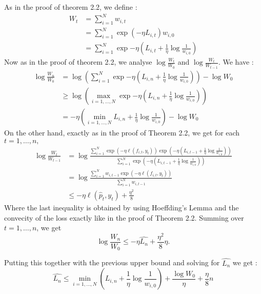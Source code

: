 \begin{solution}[]
	As in the proof of theorem 2.2, we define :
\begin{align*}
	W_t &= \sum_{i=1}^{N}w_{i,t} \\
	    &= \sum_{i=1}^{N}\exp{(-\eta L_{i,t})}w_{i,0} \\
	    &= \sum_{i=1}^{N}\exp{-\eta \left(L_{i,t} + \frac{1}{\eta}\log \frac{1}{w_{i,0}}\right)}
\end{align*}
Now as in the proof of theorem 2.2, we analyse $ \log \frac{W_t}{W_0} $ and $ \log \frac{W_t}{W_{t-1}} $.
We have :
\begin{align*}
	\log \frac{W_n}{W_0} &= \log \left( \sum_{i=1}^{N}\exp{-\eta \left(L_{i,n} + \frac{1}{\eta}\log \frac{1}{w_{i,0}}\right)} \right) - \log W_0 \\
			     &\geq \log \left( \max_{i=1,\ldots,N}\exp{-\eta \left(L_{i,n} + \frac{1}{\eta}\log \frac{1}{w_{i,0}}\right)} \right) \\
			     &= - \eta \left( \min_{i=1,\ldots,N}L_{i,n} + \frac{1}{\eta}\log \frac{1}{w_{i,0}} \right) - \log W_0
\end{align*}
On the other hand, exactly as in the proof of Theorem 2.2, we get for each $ t=1,\ldots,n, $
\begin{align*}
	\log \frac{W_t}{W_{t-1}} &= \log \frac{\sum_{i=1}^{N}\exp{(-\eta\ell(f_{i,t},y_t))}\exp{\left( -\eta \left( L_{i,t-1} + \frac{1}{\eta}\log \frac{1}{w_{i,0}} \right) \right)}}{\sum_{i=1}^{N}\exp{\left( -\eta \left( L_{i,t-1} + \frac{1}{\eta}\log \frac{1}{w_{i,0}} \right) \right)}} \\
				 &= \log \frac{\sum_{i=1}^{N}w_{i,t-1}\exp{(-\eta\ell(f_{i,t},y_t))}}{\sum_{i=1}^{N}w_{i,t-1}} \\
				 &\leq -\eta\ell(\hat{p}_t,y_t) + \frac{\eta^2}{8}
\end{align*}
Where the last inequality is obtained by using Hoeffding's Lemma and the convecity of the loss exactly like in the proof of Theorem 2.2.
Summing over $ t=1,\ldots,n $, we get
\begin{equation*}
	\log \frac{W_n}{W_0} \leq -\eta\widehat{L_n} + \frac{\eta^2}{8} \eta .
\end{equation*}

Putting this together with the previous upper bound and solving for $ \widehat{L_n} $ we get :
\begin{equation*}
	\widehat{L_n} \leq \min_{i=1,\ldots,N} \left( L_{i,n} + \frac{1}{\eta}\log \frac{1}{w_{i,0}} \right) + \frac{\log W_0}{\eta} + \frac{\eta}{8}n
\end{equation*}

\end{solution}
